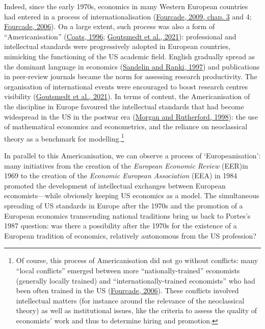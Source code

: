 \documentclass[]{elsarticle} %
\begin{document}
Indeed, since the early 1970s, economics in many Western European
countries had entered in a process of internationalisation
(\protect\hyperlink{ref-fourcade2009}{Fourcade, 2009, chap. 3} and 4;
\protect\hyperlink{ref-fourcade2006}{Fourcade, 2006}). On a large
extent, such process was also a form of ``Americanisation''
(\protect\hyperlink{ref-coats1996}{Coats, 1996};
\protect\hyperlink{ref-goutsmedt2021}{Goutsmedt et al., 2021}):
professional and intellectual standards were progressively adopted in
European countries, mimicking the functioning of the US academic field.
English gradually spread as the dominant language in economics
(\protect\hyperlink{ref-sandelin1997}{Sandelin and Ranki, 1997}) and
publications in peer-review journals became the norm for assessing
research productivity. The organisation of international events were
encouraged to boost research centres visibility
(\protect\hyperlink{ref-goutsmedt2021}{Goutsmedt et al., 2021}). In
terms of content, the Americanisation of the discipline in Europe
favoured the intellectual standards that had become widespread in the US
in the postwar era (\protect\hyperlink{ref-morgan1998}{Morgan and
Rutherford, 1998}): the use of mathematical economics and econometrics,
and the reliance on neoclassical theory as a benchmark for
modelling.\footnote{Of course, this process of Americanisation did not
  go without conflicts: many ``local conflicts'' emerged between more
  ``nationally-trained'' economists (generally locally trained) and
  ``internationally-trained economists'' who had been often trained in
  the US (\protect\hyperlink{ref-fourcade2006}{Fourcade, 2006}). These
  conflicts involved intellectual matters (for instance around the
  relevance of the neoclassical theory) as well as institutional issues,
  like the criteria to assess the quality of economists' work and thus
  to determine hiring and promotion.}

In parallel to this Americanisation, we can observe a process of
`Europeanisation': many initiatives from the creation of the
\emph{European Economic Review} (EER)in 1969 to the creation of the
\emph{Economic European Association} (EEA) in 1984 promoted the
development of intellectual exchanges between European
economists---while obviously keeping US economics as a model. The
simultaneous spreading of US standards in Europe after the 1970s and the
promotion of a European economics transcending national traditions bring
us back to Portes's 1987 question: was there a possibility after the
1970s for the existence of a European tradition of economics, relatively
autonomous from the US profession?
\end{document}
